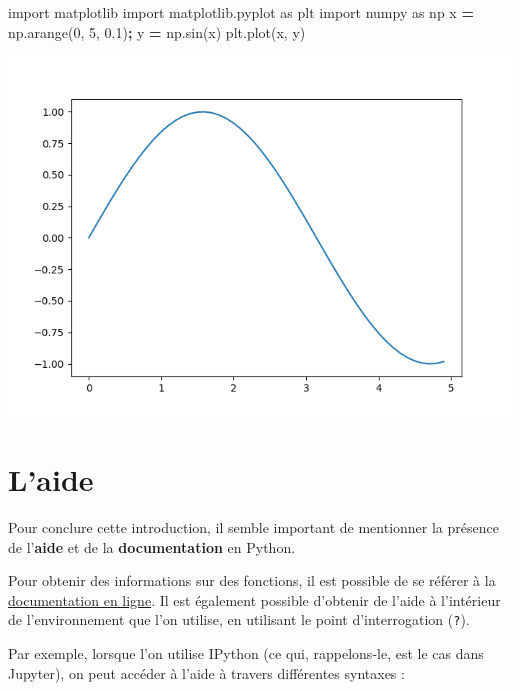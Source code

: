 \documentclass[12pt,]{book}
\newenvironment{Shaded}{\begin{snugshade}}{\end{snugshade}}
\newcommand{\DecValTok}[1]{\textcolor[rgb]{0.00,0.00,0.81}{#1}}
\newcommand{\FloatTok}[1]{\textcolor[rgb]{0.00,0.00,0.81}{#1}}
\newcommand{\ImportTok}[1]{#1}
\newcommand{\OperatorTok}[1]{\textcolor[rgb]{0.81,0.36,0.00}{\textbf{#1}}}
\newcommand{\NormalTok}[1]{#1}
\numberwithin{equation}{section}
\numberwithin{countremarque}{section}
\begin{document}
\begin{Shaded}
\begin{Highlighting}[]
\ImportTok{import}\NormalTok{ matplotlib}
\ImportTok{import}\NormalTok{ matplotlib.pyplot  }\ImportTok{as}\NormalTok{ plt}
\ImportTok{import}\NormalTok{ numpy  }\ImportTok{as}\NormalTok{ np}
\NormalTok{x }\OperatorTok{=}\NormalTok{ np.arange(}\DecValTok{0}\NormalTok{, }\DecValTok{5}\NormalTok{, }\FloatTok{0.1}\NormalTok{)}\OperatorTok{;}
\NormalTok{y }\OperatorTok{=}\NormalTok{ np.sin(x)}
\NormalTok{plt.plot(x, y)}
\end{Highlighting}
\end{Shaded}

\begin{center}\includegraphics{figs/intro_pyplot} \end{center}

\section{L'aide}\label{laide}

Pour conclure cette introduction, il semble important de mentionner la
présence de l'\textbf{aide} et de la \textbf{documentation} en Python.

Pour obtenir des informations sur des fonctions, il est possible de se
référer à la \href{https://docs.python.org/3/}{documentation en ligne}.
Il est également possible d'obtenir de l'aide à l'intérieur de
l'environnement que l'on utilise, en utilisant le point d'interrogation
(\texttt{?}).

Par exemple, lorsque l'on utilise IPython (ce qui, rappelons-le, est le
cas dans Jupyter), on peut accéder à l'aide à travers différentes
syntaxes :
\end{document}
